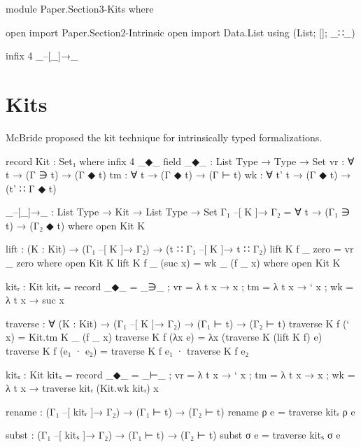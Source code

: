 \begin{code}[hide]
module Paper.Section3-Kits where

open import Paper.Section2-Intrinsic
open import Data.List using (List; []; _∷_)

infix  4  _–[_]→_
\end{code}

\newpage
\section{Kits}

McBride proposed the kit technique for intrinsically typed formalizations.

\begin{code}
record Kit : Set₁ where
  infix 4 _◆_
  field
    _◆_  : List Type → Type → Set
    vr   : ∀ t → (Γ ∋ t) → (Γ ◆ t)
    tm   : ∀ t → (Γ ◆ t) → (Γ ⊢ t)
    wk   : ∀ {t'} t → (Γ ◆ t) → (t' ∷ Γ ◆ t)

_–[_]→_ : List Type → Kit → List Type → Set
Γ₁ –[ K ]→ Γ₂ = ∀ t → (Γ₁ ∋ t) → (Γ₂ ◆ t) where open Kit K

lift : (K : Kit) → (Γ₁ –[ K ]→ Γ₂) → (t ∷ Γ₁ –[ K ]→ t ∷ Γ₂)
lift K f _ zero     = vr _ zero     where open Kit K
lift K f _ (suc x)  = wk _ (f _ x)  where open Kit K

kitᵣ : Kit
kitᵣ = record {  _◆_  =  _∋_
              ;  vr   = λ t x → x
              ;  tm   = λ t x → ` x
              ;  wk   = λ t x → suc x
              }

traverse : ∀ (K : Kit) → (Γ₁ –[ K ]→ Γ₂) → (Γ₁ ⊢ t) → (Γ₂ ⊢ t)
traverse K f (` x)      = Kit.tm K _ (f _ x)
traverse K f (λx e)     = λx (traverse K (lift K f) e)
traverse K f (e₁ · e₂)  = traverse K f e₁ · traverse K f e₂

kitₛ : Kit
kitₛ = record {  _◆_  = _⊢_
              ;  vr   = λ t x → ` x
              ;  tm   = λ t x → x
              ;  wk   = λ t x → traverse kitᵣ (Kit.wk kitᵣ) x
              }

rename : (Γ₁ –[ kitᵣ ]→ Γ₂) → (Γ₁ ⊢ t) → (Γ₂ ⊢ t)
rename ρ e = traverse kitᵣ ρ e

subst : (Γ₁ –[ kitₛ ]→ Γ₂) → (Γ₁ ⊢ t) → (Γ₂ ⊢ t)
subst σ e = traverse kitₛ σ e
\end{code}
